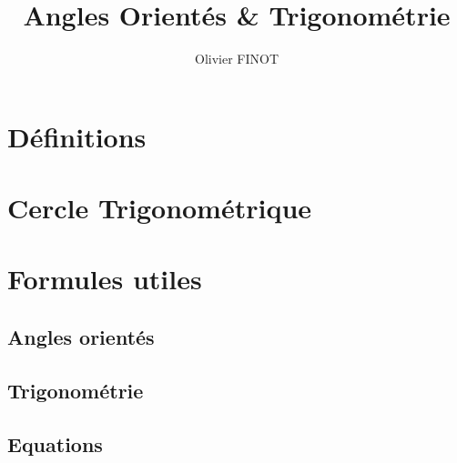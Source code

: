 \documentclass[12pt,a4paper]{article}
\author{Olivier FINOT}
\date{}
\title{Angles Orientés \& Trigonométrie }
\begin{document}
\maketitle



\section{Définitions}
%
	

%

\section{Cercle Trigonométrique}

\begin{center}

\end{center}
%
%
\section{Formules utiles}
%
\subsection*{Angles orientés}
%

%
%
\subsection*{Trigonométrie}
%




\subsection*{Equations}


%
%
%
%
%
%
%
%
\end{document}
